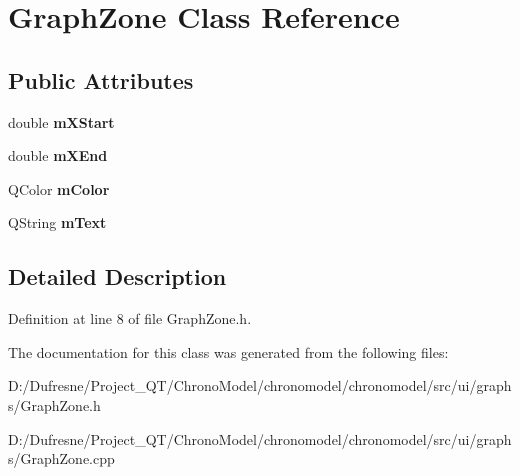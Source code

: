 \hypertarget{class_graph_zone}{\section{Graph\-Zone Class Reference}
\label{class_graph_zone}
}
\subsection*{Public Attributes}
\begin{DoxyCompactItemize}
\item 
\hypertarget{class_graph_zone_af8260732ca2bb77e205ded9ecc4ff790}{double {\bfseries m\-X\-Start}}\label{class_graph_zone_af8260732ca2bb77e205ded9ecc4ff790}

\item 
\hypertarget{class_graph_zone_a7424ecf56a18c8fbd2ca06ede7acd239}{double {\bfseries m\-X\-End}}\label{class_graph_zone_a7424ecf56a18c8fbd2ca06ede7acd239}

\item 
\hypertarget{class_graph_zone_a2b0e54df4c2a46bb50eed64e7fe3a65c}{Q\-Color {\bfseries m\-Color}}\label{class_graph_zone_a2b0e54df4c2a46bb50eed64e7fe3a65c}

\item 
\hypertarget{class_graph_zone_a7131445ebf4f53da3eff302fc1097b57}{Q\-String {\bfseries m\-Text}}\label{class_graph_zone_a7131445ebf4f53da3eff302fc1097b57}

\end{DoxyCompactItemize}


\subsection{Detailed Description}


Definition at line 8 of file Graph\-Zone.\-h.



The documentation for this class was generated from the following files\-:\begin{DoxyCompactItemize}
\item 
D\-:/\-Dufresne/\-Project\-\_\-\-Q\-T/\-Chrono\-Model/chronomodel/chronomodel/src/ui/graphs/Graph\-Zone.\-h\item 
D\-:/\-Dufresne/\-Project\-\_\-\-Q\-T/\-Chrono\-Model/chronomodel/chronomodel/src/ui/graphs/Graph\-Zone.\-cpp\end{DoxyCompactItemize}
